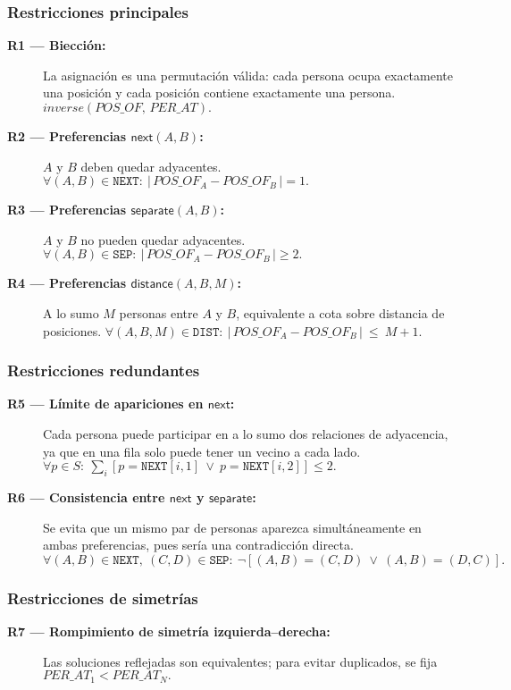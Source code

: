 \subsubsection*{Restricciones principales}
\begin{description}
  \item[\textbf{R1 — Biección:}] La asignación es una permutación válida: cada persona ocupa exactamente una posición y cada posición contiene exactamente una persona. \(\textit{inverse}(POS\_OF,\,PER\_AT).\)
  \item[\textbf{R2 — Preferencias \(\textsf{next}(A,B)\):}] \(A\) y \(B\) deben quedar adyacentes. \(\forall (A,B)\in \texttt{NEXT}:\ \big|\,POS\_OF_A - POS\_OF_B\,\big| = 1.\)
  \item[\textbf{R3 — Preferencias \(\textsf{separate}(A,B)\):}] \(A\) y \(B\) no pueden quedar adyacentes. \(\forall (A,B)\in \texttt{SEP}:\ \big|\,POS\_OF_A - POS\_OF_B\,\big| \ge 2.\)
  \item[\textbf{R4 — Preferencias \(\textsf{distance}(A,B,M)\):}] A lo sumo \(M\) personas entre \(A\) y \(B\), equivalente a cota sobre distancia de posiciones. \(\forall (A,B,M)\in \texttt{DIST}:\ \big|\,POS\_OF_A - POS\_OF_B\,\big|\ \le\ M+1.\)
\end{description}
\subsubsection*{Restricciones redundantes}
\begin{description}
  \item[\textbf{R5 — Límite de apariciones en \(\textsf{next}\):}] Cada persona puede participar en a lo sumo dos relaciones de adyacencia, ya que en una fila solo puede tener un vecino a cada lado. \(\forall p\in S:\ \sum_i [p=\texttt{NEXT}[i,1]\ \vee\ p=\texttt{NEXT}[i,2]] \le 2.\)
  \item[\textbf{R6 — Consistencia entre \(\textsf{next}\) y \(\textsf{separate}\):}] Se evita que un mismo par de personas aparezca simultáneamente en ambas preferencias, pues sería una contradicción directa. \(\forall (A,B)\in\texttt{NEXT},\ (C,D)\in\texttt{SEP}:\ \neg[(A,B)=(C,D)\ \vee\ (A,B)=(D,C)].\)
\end{description}
\subsubsection*{Restricciones de simetrías}
\begin{description}
  \item[\textbf{R7 — Rompimiento de simetría izquierda–derecha:}] Las soluciones reflejadas son equivalentes; para evitar duplicados, se fija \(PER\_AT_1<PER\_AT_N.\)
\end{description}

